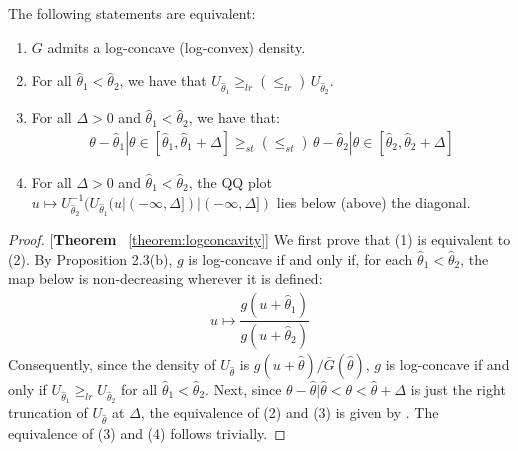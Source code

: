 \begin{theorem}\label{theorem:logconcavity} The following statements are equivalent:
\vspace{-5pt}
\begin{enumerate}[label=(\arabic*),ref=\thelemma(\arabic*)]
   \item $G$ admits a log-concave (log-convex) density. 
   \item For all $\hat{\theta}_1<\hat{\theta}_2$, we have that $U_{\hat{\theta}_1}\geq_{lr} (\leq_{lr})\,U_{\hat{\theta}_2}$. 
   \item For all $\Delta>0$ and $\hat{\theta}_1<\hat{\theta}_2$, we have that:
   \begin{align*}
        \theta-\hat{\theta}_1|\theta\in[\hat{\theta}_1,\hat{\theta}_1+\Delta] \geq_{st}(\leq_{st})\,\theta-\hat{\theta}_2|\theta\in[\hat{\theta}_2,\hat{\theta}_2+\Delta] 
   \end{align*}
   \item For all $\Delta>0$ and $\hat{\theta}_1<\hat{\theta}_2$, the QQ plot $u\mapsto U_{\hat{\theta}_2}^{-1}(U_{\hat{\theta}_1}(u|(-\infty,\Delta])|(-\infty,\Delta])$ lies below (above) the diagonal.
\end{enumerate}
\end{theorem}

\begin{proof}{[\textbf{Theorem} ~\ref{theorem:logconcavity}]} We first prove that (1) is equivalent to (2). By \citet{saumard2014logconcavity} Proposition 2.3(b), $g$ is log-concave if and only if, for each $\hat{\theta}_1<\hat{\theta}_2$, the map below is non-decreasing wherever it is defined:
\begin{align*}
    u\mapsto \dfrac{g(u+\hat{\theta}_1)}{g(u+\hat{\theta}_2)}
\end{align*}
Consequently, since the density of $U_{\hat{\theta}}$ is $g(u+\hat{\theta})/\bar{G}(\hat{\theta})$, $g$ is log-concave if and only if $U_{\hat{\theta}_1}\geq_{lr} U_{\hat{\theta}_2}$ for all $\hat{\theta}_1<\hat{\theta}_2$. Next, since $\theta-\hat{\theta}|\hat{\theta}<\theta<\hat{\theta}+\Delta$ is just the right truncation of $U_{\hat{\theta}}$ at $\Delta$, the equivalence of (2) and (3) is given by \citet[Theorem 1.C.5]{shaked2007stochastic}. The equivalence of (3) and (4) follows trivially. 
\end{proof}





